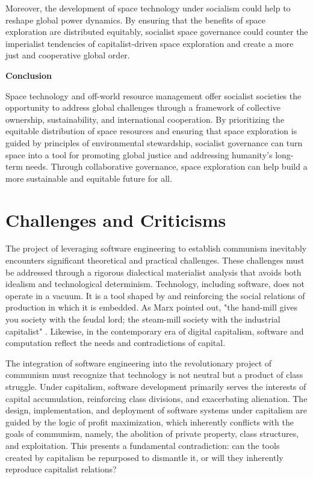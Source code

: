 \begin{refsection}
Moreover, the development of space technology under socialism could help to reshape global power dynamics. By ensuring that the benefits of space exploration are distributed equitably, socialist space governance could counter the imperialist tendencies of capitalist-driven space exploration and create a more just and cooperative global order.

\textbf{Conclusion}

Space technology and off-world resource management offer socialist societies the opportunity to address global challenges through a framework of collective ownership, sustainability, and international cooperation. By prioritizing the equitable distribution of space resources and ensuring that space exploration is guided by principles of environmental stewardship, socialist governance can turn space into a tool for promoting global justice and addressing humanity's long-term needs. Through collaborative governance, space exploration can help build a more sustainable and equitable future for all.

\section{Challenges and Criticisms}

The project of leveraging software engineering to establish communism inevitably encounters significant theoretical and practical challenges. These challenges must be addressed through a rigorous dialectical materialist analysis that avoids both idealism and technological determinism. Technology, including software, does not operate in a vacuum. It is a tool shaped by and reinforcing the social relations of production in which it is embedded. As Marx pointed out, "the hand-mill gives you society with the feudal lord; the steam-mill society with the industrial capitalist" \cite[pp.~47]{marx_grundrisse}. Likewise, in the contemporary era of digital capitalism, software and computation reflect the needs and contradictions of capital. 

The integration of software engineering into the revolutionary project of communism must recognize that technology is not neutral but a product of class struggle. Under capitalism, software development primarily serves the interests of capital accumulation, reinforcing class divisions, and exacerbating alienation. The design, implementation, and deployment of software systems under capitalism are guided by the logic of profit maximization, which inherently conflicts with the goals of communism, namely, the abolition of private property, class structures, and exploitation. This presents a fundamental contradiction: can the tools created by capitalism be repurposed to dismantle it, or will they inherently reproduce capitalist relations?


\end{refsection}
